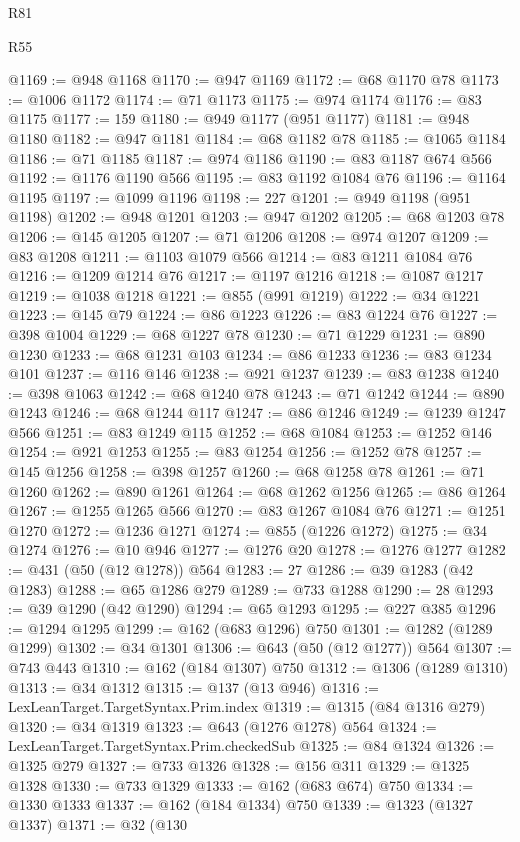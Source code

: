\begin{lexlean}{R81}
\begin{lexlean}{R55}
\begin{coremodule}
{{{{{{{{{{{{{{{{{{{{{{{{{{{{{{{{{{{{{{{{{{{{{{{{{{{{{{{{{{{{{{@1169 := @948 @1168
@1170 := @947 @1169
@1172 := @68 @1170 @78
@1173 := @1006 @1172
@1174 := @71 @1173
@1175 := @974 @1174
@1176 := @83 @1175
@1177 := 159
@1180 := @949 @1177 (@951 @1177)
@1181 := @948 @1180
@1182 := @947 @1181
@1184 := @68 @1182 @78
@1185 := @1065 @1184
@1186 := @71 @1185
@1187 := @974 @1186
@1190 := @83 @1187 @674 @566
@1192 := @1176 @1190 @566
@1195 := @83 @1192 @1084 @76
@1196 := @1164 @1195
@1197 := @1099 @1196
@1198 := 227
@1201 := @949 @1198 (@951 @1198)
@1202 := @948 @1201
@1203 := @947 @1202
@1205 := @68 @1203 @78
@1206 := @145 @1205
@1207 := @71 @1206
@1208 := @974 @1207
@1209 := @83 @1208
@1211 := @1103 @1079 @566
@1214 := @83 @1211 @1084 @76
@1216 := @1209 @1214 @76
@1217 := @1197 @1216
@1218 := @1087 @1217
@1219 := @1038 @1218
@1221 := @855 (@991 @1219)
@1222 := @34 @1221
@1223 := @145 @79
@1224 := @86 @1223
@1226 := @83 @1224 @76
@1227 := @398 @1004
@1229 := @68 @1227 @78
@1230 := @71 @1229
@1231 := @890 @1230
@1233 := @68 @1231 @103
@1234 := @86 @1233
@1236 := @83 @1234 @101
@1237 := @116 @146
@1238 := @921 @1237
@1239 := @83 @1238
@1240 := @398 @1063
@1242 := @68 @1240 @78
@1243 := @71 @1242
@1244 := @890 @1243
@1246 := @68 @1244 @117
@1247 := @86 @1246
@1249 := @1239 @1247 @566
@1251 := @83 @1249 @115
@1252 := @68 @1084
@1253 := @1252 @146
@1254 := @921 @1253
@1255 := @83 @1254
@1256 := @1252 @78
@1257 := @145 @1256
@1258 := @398 @1257
@1260 := @68 @1258 @78
@1261 := @71 @1260
@1262 := @890 @1261
@1264 := @68 @1262 @1256
@1265 := @86 @1264
@1267 := @1255 @1265 @566
@1270 := @83 @1267 @1084 @76
@1271 := @1251 @1270
@1272 := @1236 @1271
@1274 := @855 (@1226 @1272)
@1275 := @34 @1274
@1276 := @10 @946
@1277 := @1276 @20
@1278 := @1276 @1277
@1282 := @431 (@50 (@12 @1278)) @564
@1283 := 27
@1286 := @39 @1283 (@42 @1283)
@1288 := @65 @1286 @279
@1289 := @733 @1288
@1290 := 28
@1293 := @39 @1290 (@42 @1290)
@1294 := @65 @1293
@1295 := @227 @385
@1296 := @1294 @1295
@1299 := @162 (@683 @1296) @750
@1301 := @1282 (@1289 @1299)
@1302 := @34 @1301
@1306 := @643 (@50 (@12 @1277)) @564
@1307 := @743 @443
@1310 := @162 (@184 @1307) @750
@1312 := @1306 (@1289 @1310)
@1313 := @34 @1312
@1315 := @137 (@13 @946)
@1316 := LexLeanTarget.TargetSyntax.Prim.index
@1319 := @1315 (@84 @1316 @279)
@1320 := @34 @1319
@1323 := @643 (@1276 @1278) @564
@1324 := LexLeanTarget.TargetSyntax.Prim.checkedSub
@1325 := @84 @1324
@1326 := @1325 @279
@1327 := @733 @1326
@1328 := @156 @311
@1329 := @1325 @1328
@1330 := @733 @1329
@1333 := @162 (@683 @674) @750
@1334 := @1330 @1333
@1337 := @162 (@184 @1334) @750
@1339 := @1323 (@1327 @1337)
@1371 := @32
    (@130
}}}}}}}}}}}}}}}}}}}}}}}}}}}}}}}}}}}}}}}}}}}}}}}}}}}}}}}}}}}}}}
\end{coremodule}
\end{lexlean}
\end{lexlean}
